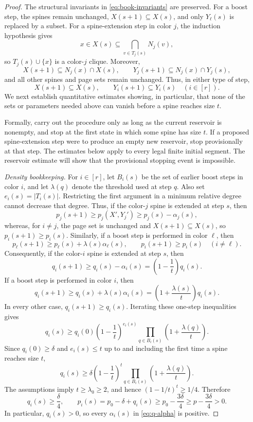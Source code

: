 \documentclass[10pt,a4paper]{amsart}
\begin{document}
\begin{proof}
The structural invariants in \eqref{eq:book-invariants} are preserved. For a
boost step, the spines remain unchanged, $X(s+1)\subseteq X(s)$, and only
$Y_\ell(s)$ is replaced by a subset. For a spine-extension step in color
$j$, the induction hypothesis gives
\[
 x\in X(s)\subseteq\bigcap_{v\in T_j(s)}N_j(v),
\]
so $T_j(s)\cup\{x\}$ is a color-$j$ clique. Moreover,
\[
 X(s+1)\subseteq N_j(x)\cap X(s),
 \qquad
 Y_j(s+1)\subseteq N_j(x)\cap Y_j(s),
\]
and all other spines and page sets remain unchanged. Thus, in either type of
step,
\[
 X(s+1)\subseteq X(s),
 \qquad
 Y_i(s+1)\subseteq Y_i(s)
 \quad(i\in[r]).
\]
We next establish quantitative estimates showing, in particular, that none
of the sets or parameters needed above can vanish before a spine reaches
size $t$.

Formally, carry out the procedure only as long as the current reservoir is
nonempty, and stop at the first state in which some spine has size $t$. If a
proposed spine-extension step were to produce an empty new reservoir, stop
provisionally at that step. The estimates below apply to every legal finite
initial segment. The reservoir estimate will show that the provisional
stopping event is impossible.

\medskip
\noindent\emph{Density bookkeeping.}
For $i\in[r]$, let $B_i(s)$ be the set of earlier boost steps in color $i$,
and let $\lambda(q)$ denote the threshold used at step $q$. Also set
$ e_i(s)=|T_i(s)|$.
Restricting the first argument in a minimum relative degree cannot decrease
that degree. Thus, if the color-$j$ spine is extended at step $s$, then
\[
 p_j(s+1)\ge p_j(X',Y_j')\ge p_j(s)-\alpha_j(s),
\]
whereas, for $i\ne j$, the page set is unchanged and
$X(s+1)\subseteq X(s)$, so $p_i(s+1)\ge p_i(s)$. Similarly, if a boost step
is performed in color $\ell$, then
\[
 p_\ell(s+1)\ge p_\ell(s)+\lambda(s)\alpha_\ell(s),
 \qquad
 p_i(s+1)\ge p_i(s)\quad(i\ne\ell).
\]
Consequently, if the color-$i$ spine is extended at step $s$, then
\[
 q_i(s+1)
 \ge q_i(s)-\alpha_i(s)
 =\left(1-\frac1t\right)q_i(s).
\]
If a boost step is performed in color $i$, then
\[
 q_i(s+1)
 \ge q_i(s)+\lambda(s)\alpha_i(s)
 =\left(1+\frac{\lambda(s)}t\right)q_i(s).
\]
In every other case, $q_i(s+1)\ge q_i(s)$. Iterating these one-step
inequalities gives
\[
 q_i(s)
 \ge q_i(0)\left(1-\frac1t\right)^{e_i(s)}
 \prod_{q\in B_i(s)}\left(1+\frac{\lambda(q)}t\right).
\]
Since $q_i(0)\ge\delta$ and $e_i(s)\le t$ up to and including the first
time a spine reaches size $t$,
\begin{equation}\label{eq:q-product}
 q_i(s)
 \ge\delta\left(1-\frac1t\right)^t
 \prod_{q\in B_i(s)}\left(1+\frac{\lambda(q)}t\right).
\end{equation}
The assumptions imply $t\ge\lambda_0\ge2$, and hence
$(1-1/t)^t\ge1/4$. Therefore
\begin{equation}\label{eq:p-lower}
 q_i(s)\ge\frac\delta4,
 \qquad
 p_i(s)=p_0-\delta+q_i(s)
 \ge p_0-\frac{3\delta}{4}
 \ge p-\frac{3\delta}{4}>0.
\end{equation}
In particular, $q_i(s)>0$, so every $\alpha_i(s)$ in
\eqref{eq:q-alpha} is positive.


\end{proof}
\end{document}
